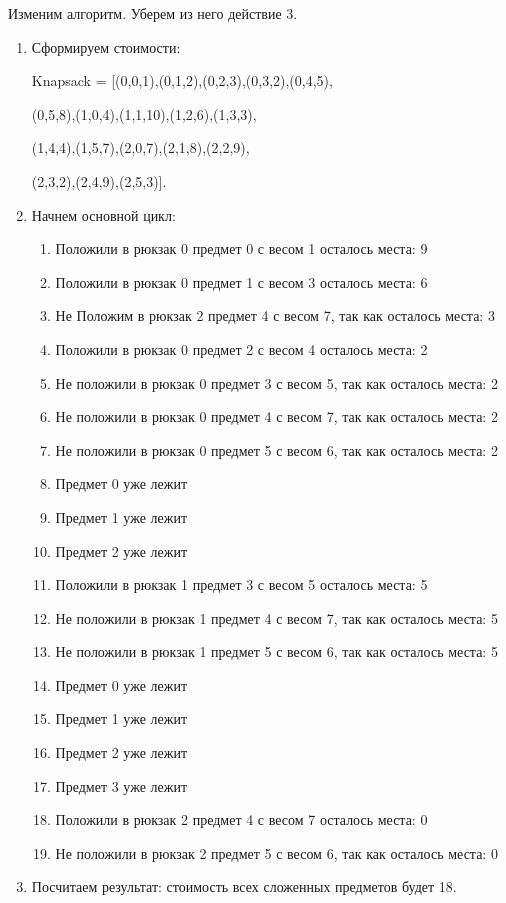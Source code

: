 \documentclass[14pt,a4paper]{extarticle}
\begin{document}
Изменим алгоритм. Уберем из него действие 3. 
\begin{enumerate}

\item Сформируем стоимости:

Knapsack = [(0,0,1),(0,1,2),(0,2,3),(0,3,2),(0,4,5),

(0,5,8),(1,0,4),(1,1,10),(1,2,6),(1,3,3),

(1,4,4),(1,5,7),(2,0,7),(2,1,8),(2,2,9),

(2,3,2),(2,4,9),(2,5,3)].

\item Начнем основной цикл:

	\begin{enumerate}
		\item Положили в рюкзак 0 предмет 0 с весом 1 осталось места: 9
		\item Положили в рюкзак 0 предмет 1 с весом 3 осталось места: 6

		\item Не Положим в рюкзак 2 предмет 4 с весом 7, так как осталось места: 3
		\item Положили в рюкзак 0 предмет 2 с весом 4 осталось места: 2

		\item Не положили в рюкзак 0 предмет 3 с весом 5, так как осталось места: 2

		\item Не положили в рюкзак 0 предмет 4 с весом 7, так как осталось места: 2

		\item Не положили в рюкзак 0 предмет 5 с весом 6, так как осталось места: 2

		\item Предмет 0 уже лежит

		\item Предмет 1 уже лежит
		\item Предмет 2 уже лежит
		\item Положили в рюкзак 1 предмет 3 с весом 5 осталось места: 5
		\item Не положили в рюкзак 1 предмет 4 с весом 7, так как осталось места: 5

		\item Не положили в рюкзак 1 предмет 5 с весом 6, так как осталось места: 5

		\item Предмет 0 уже лежит
		\item Предмет 1 уже лежит
		\item Предмет 2 уже лежит
 		\item Предмет 3 уже лежит
		\item Положили в рюкзак 2 предмет 4 с весом 7 осталось места: 0
 		\item Не положили в рюкзак 2 предмет 5 с весом 6, так как осталось места: 0
	\end{enumerate}
	
	\item Посчитаем результат: стоимость всех сложенных предметов будет 18.

\end{enumerate}
\end{document}
